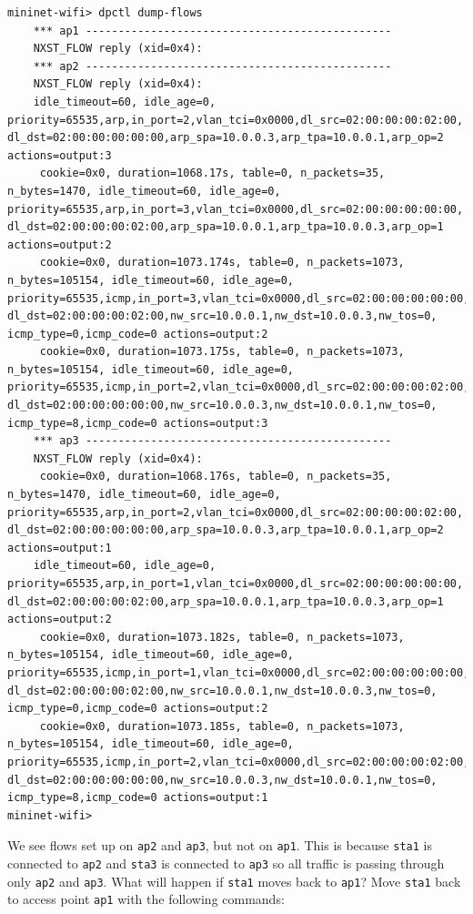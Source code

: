 \begin{verbatim}
mininet-wifi> dpctl dump-flows
    *** ap1 -----------------------------------------------
    NXST_FLOW reply (xid=0x4):
    *** ap2 -----------------------------------------------
    NXST_FLOW reply (xid=0x4):
    idle_timeout=60, idle_age=0, priority=65535,arp,in_port=2,vlan_tci=0x0000,dl_src=02:00:00:00:02:00, dl_dst=02:00:00:00:00:00,arp_spa=10.0.0.3,arp_tpa=10.0.0.1,arp_op=2 actions=output:3
     cookie=0x0, duration=1068.17s, table=0, n_packets=35, n_bytes=1470, idle_timeout=60, idle_age=0, priority=65535,arp,in_port=3,vlan_tci=0x0000,dl_src=02:00:00:00:00:00, dl_dst=02:00:00:00:02:00,arp_spa=10.0.0.1,arp_tpa=10.0.0.3,arp_op=1 actions=output:2
     cookie=0x0, duration=1073.174s, table=0, n_packets=1073, n_bytes=105154, idle_timeout=60, idle_age=0, priority=65535,icmp,in_port=3,vlan_tci=0x0000,dl_src=02:00:00:00:00:00, dl_dst=02:00:00:00:02:00,nw_src=10.0.0.1,nw_dst=10.0.0.3,nw_tos=0, icmp_type=0,icmp_code=0 actions=output:2
     cookie=0x0, duration=1073.175s, table=0, n_packets=1073, n_bytes=105154, idle_timeout=60, idle_age=0, priority=65535,icmp,in_port=2,vlan_tci=0x0000,dl_src=02:00:00:00:02:00, dl_dst=02:00:00:00:00:00,nw_src=10.0.0.3,nw_dst=10.0.0.1,nw_tos=0, icmp_type=8,icmp_code=0 actions=output:3
    *** ap3 -----------------------------------------------
    NXST_FLOW reply (xid=0x4):
     cookie=0x0, duration=1068.176s, table=0, n_packets=35, n_bytes=1470, idle_timeout=60, idle_age=0, priority=65535,arp,in_port=2,vlan_tci=0x0000,dl_src=02:00:00:00:02:00, dl_dst=02:00:00:00:00:00,arp_spa=10.0.0.3,arp_tpa=10.0.0.1,arp_op=2 actions=output:1
    idle_timeout=60, idle_age=0, priority=65535,arp,in_port=1,vlan_tci=0x0000,dl_src=02:00:00:00:00:00, dl_dst=02:00:00:00:02:00,arp_spa=10.0.0.1,arp_tpa=10.0.0.3,arp_op=1 actions=output:2
     cookie=0x0, duration=1073.182s, table=0, n_packets=1073, n_bytes=105154, idle_timeout=60, idle_age=0, priority=65535,icmp,in_port=1,vlan_tci=0x0000,dl_src=02:00:00:00:00:00, dl_dst=02:00:00:00:02:00,nw_src=10.0.0.1,nw_dst=10.0.0.3,nw_tos=0, icmp_type=0,icmp_code=0 actions=output:2
     cookie=0x0, duration=1073.185s, table=0, n_packets=1073, n_bytes=105154, idle_timeout=60, idle_age=0, priority=65535,icmp,in_port=2,vlan_tci=0x0000,dl_src=02:00:00:00:02:00, dl_dst=02:00:00:00:00:00,nw_src=10.0.0.3,nw_dst=10.0.0.1,nw_tos=0, icmp_type=8,icmp_code=0 actions=output:1
mininet-wifi>
\end{verbatim} 

We see flows set up on \texttt{ap2} and \texttt{ap3}, but not on \texttt{ap1}. This is because \texttt{sta1} is connected to \texttt{ap2} and \texttt{sta3} is connected to \texttt{ap3} so all traffic is passing through only \texttt{ap2} and \texttt{ap3}. What will happen if \texttt{sta1} moves back to \texttt{ap1}? Move \texttt{sta1} back to access point \texttt{ap1} with the following commands:

